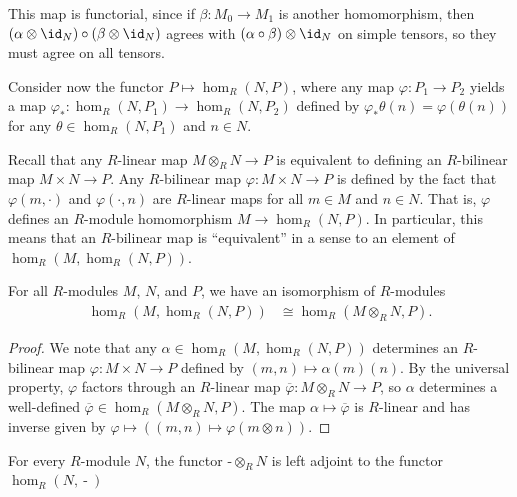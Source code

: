 \documentclass[10pt]{mypackage}
\begin{document}
This map is functorial, since if $\beta\colon M_0\rightarrow M_1$ is another homomorphism, then $\left( \alpha\otimes \id_N \right)\circ \left( \beta\otimes \id_N \right)$ agrees with $\left( \alpha\circ\beta \right)\otimes \id_N$ on simple tensors, so they must agree on all tensors.

Consider now the functor $P\mapsto \hom_{R}\left( N,P \right)$, where any map $\varphi\colon P_1\rightarrow P_2$ yields a map $\varphi_{\ast}\colon \hom_{R}\left( N,P_1 \right)\rightarrow \hom_R\left( N,P_2 \right)$ defined by $\varphi_{\ast}\theta(n) = \varphi\left( \theta(n) \right)$ for any $\theta\in \hom_R\left( N,P_1 \right)$ and $n\in N$.

Recall that any $R$-linear map $M\otimes_{R}N\rightarrow P$ is equivalent to defining an $R$-bilinear map $M\times N\rightarrow P$. Any $R$-bilinear map $\varphi\colon M\times N\rightarrow P$ is defined by the fact that $\varphi\left( m,\cdot \right)$ and $\varphi\left( \cdot,n \right)$ are $R$-linear maps for all $m\in M$ and $n\in N$. That is, $\varphi$ defines an $R$-module homomorphism $M\rightarrow \hom_R\left( N,P \right)$. In particular, this means that an $R$-bilinear map is ``equivalent'' in a sense to an element of $\hom_R\left( M,\hom_R\left( N,P \right) \right)$.
\begin{lemma}
  For all $R$-modules $M$, $N$, and $P$, we have an isomorphism of $R$-modules
  \begin{align*}
    \hom_R\left( M,\hom_R\left( N,P \right) \right) &\cong \hom_R\left( M\otimes_{R}N,P \right).
  \end{align*}
\end{lemma}
\begin{proof}
  We note that any $\alpha\in \hom_R\left( M,\hom_R\left( N,P \right) \right)$ determines an $R$-bilinear map $\varphi\colon M\times N\rightarrow P$ defined by $\left( m,n \right)\mapsto \alpha\left( m \right)\left( n \right)$. By the universal property, $\varphi$ factors through an $R$-linear map $ \overline{\varphi}\colon M\otimes_{R}N\rightarrow P $, so $\alpha$ determines a well-defined $ \overline{\varphi}\in \hom_R\left( M\otimes_{R}N,P \right) $. The map $\alpha\mapsto \overline{\varphi}$ is $R$-linear and has inverse given by $\varphi\mapsto \left( \left( m,n \right)\mapsto \varphi\left(m\otimes n\right) \right)$.
\end{proof}
\begin{corollary}
  For every $R$-module $N$, the functor $\operatorname{-}\otimes_{R}N$ is left adjoint to the functor $\hom_{R}\left( N,\operatorname{-} \right)$
\end{corollary}
\end{document}
